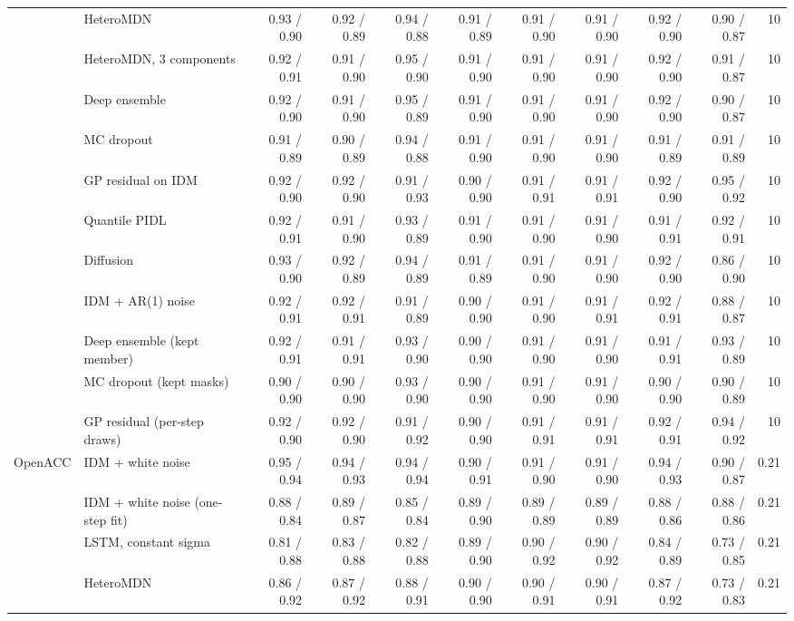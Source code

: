 \begin{table}[htbp]
\begin{tabular}{llrrrrrrrrr}
 & HeteroMDN & 0.93 / 0.90 & 0.92 / 0.89 & 0.94 / 0.88 & 0.91 / 0.89 & 0.91 / 0.90 & 0.91 / 0.90 & 0.92 / 0.90 & 0.90 / 0.87 & 10 \\
 & HeteroMDN, 3 components & 0.92 / 0.91 & 0.91 / 0.90 & 0.95 / 0.90 & 0.91 / 0.90 & 0.91 / 0.90 & 0.91 / 0.90 & 0.92 / 0.90 & 0.91 / 0.87 & 10 \\
 & Deep ensemble & 0.92 / 0.90 & 0.91 / 0.90 & 0.95 / 0.89 & 0.91 / 0.90 & 0.91 / 0.90 & 0.91 / 0.90 & 0.92 / 0.90 & 0.90 / 0.87 & 10 \\
 & MC dropout & 0.91 / 0.89 & 0.90 / 0.89 & 0.94 / 0.88 & 0.91 / 0.90 & 0.91 / 0.90 & 0.91 / 0.90 & 0.91 / 0.89 & 0.91 / 0.89 & 10 \\
 & GP residual on IDM & 0.92 / 0.90 & 0.92 / 0.90 & 0.91 / 0.93 & 0.90 / 0.90 & 0.91 / 0.91 & 0.91 / 0.91 & 0.92 / 0.90 & 0.95 / 0.92 & 10 \\
 & Quantile PIDL & 0.92 / 0.91 & 0.91 / 0.90 & 0.93 / 0.89 & 0.91 / 0.90 & 0.91 / 0.90 & 0.91 / 0.90 & 0.91 / 0.91 & 0.92 / 0.91 & 10 \\
 & Diffusion & 0.93 / 0.90 & 0.92 / 0.89 & 0.94 / 0.89 & 0.91 / 0.89 & 0.91 / 0.90 & 0.91 / 0.90 & 0.92 / 0.90 & 0.86 / 0.90 & 10 \\
 & IDM + AR(1) noise & 0.92 / 0.91 & 0.92 / 0.91 & 0.91 / 0.89 & 0.90 / 0.90 & 0.91 / 0.90 & 0.91 / 0.91 & 0.92 / 0.91 & 0.88 / 0.87 & 10 \\
 & Deep ensemble (kept member) & 0.92 / 0.91 & 0.91 / 0.91 & 0.93 / 0.90 & 0.90 / 0.90 & 0.91 / 0.90 & 0.91 / 0.90 & 0.91 / 0.91 & 0.93 / 0.89 & 10 \\
 & MC dropout (kept masks) & 0.90 / 0.90 & 0.90 / 0.90 & 0.93 / 0.90 & 0.90 / 0.90 & 0.91 / 0.90 & 0.91 / 0.90 & 0.90 / 0.90 & 0.90 / 0.89 & 10 \\
 & GP residual (per-step draws) & 0.92 / 0.90 & 0.92 / 0.90 & 0.91 / 0.92 & 0.90 / 0.90 & 0.91 / 0.91 & 0.91 / 0.91 & 0.92 / 0.91 & 0.94 / 0.92 & 10 \\
\midrule
OpenACC & IDM + white noise & 0.95 / 0.94 & 0.94 / 0.93 & 0.94 / 0.94 & 0.90 / 0.91 & 0.91 / 0.90 & 0.91 / 0.90 & 0.94 / 0.93 & 0.90 / 0.87 & 0.21 \\
 & IDM + white noise (one-step fit) & 0.88 / 0.84 & 0.89 / 0.87 & 0.85 / 0.84 & 0.89 / 0.90 & 0.89 / 0.89 & 0.89 / 0.89 & 0.88 / 0.86 & 0.88 / 0.86 & 0.21 \\
 & LSTM, constant sigma & 0.81 / 0.88 & 0.83 / 0.88 & 0.82 / 0.88 & 0.89 / 0.90 & 0.90 / 0.92 & 0.90 / 0.92 & 0.84 / 0.89 & 0.73 / 0.85 & 0.21 \\
 & HeteroMDN & 0.86 / 0.92 & 0.87 / 0.92 & 0.88 / 0.91 & 0.90 / 0.90 & 0.90 / 0.91 & 0.90 / 0.91 & 0.87 / 0.92 & 0.73 / 0.83 & 0.21 \\

\end{tabular}
\end{table}
